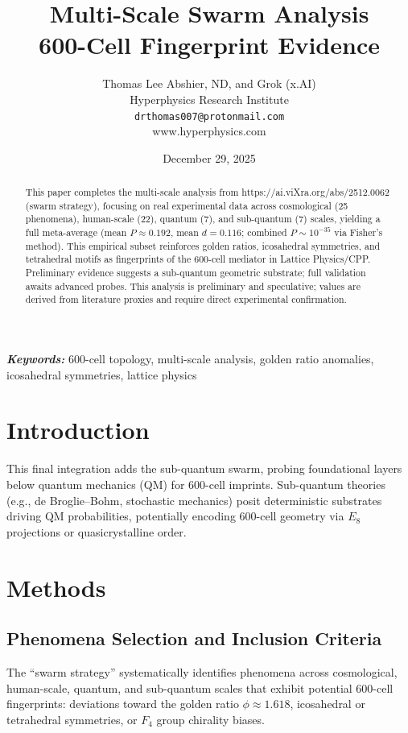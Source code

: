 \documentclass[11pt,a4paper]{article}
\title{\textbf{Multi-Scale Swarm Analysis\\
600-Cell Fingerprint Evidence}}
\author{Thomas Lee Abshier, ND, and Grok (x.AI)\\
Hyperphysics Research Institute \\
\texttt{drthomas007@protonmail.com}\\
www.hyperphysics.com}
\date{December 29, 2025}
\providecommand{\keywords}[1]
{
  \small	
  \textbf{\textit{Keywords:}} #1
}
\begin{document}
\maketitle

\begin{abstract}
This paper completes the multi-scale analysis from https://ai.viXra.org/abs/2512.0062 (swarm strategy), focusing on real experimental data across cosmological (25 phenomena), human-scale (22), quantum (7), and sub-quantum (7) scales, yielding a full meta-average (mean $P \approx 0.192$, mean $d = 0.116$; combined $P \sim 10^{-35}$ via Fisher's method). This empirical subset reinforces golden ratios, icosahedral symmetries, and tetrahedral motifs as fingerprints of the 600-cell mediator in Lattice Physics/CPP. Preliminary evidence suggests a sub-quantum geometric substrate; full validation awaits advanced probes. This analysis is preliminary and speculative; values are derived from literature proxies and require direct experimental confirmation.
\end{abstract}

\keywords{600-cell topology, multi-scale analysis, golden ratio anomalies, icosahedral symmetries, lattice physics}

\tableofcontents
\newpage

\section{Introduction}

This final integration adds the sub-quantum swarm, probing foundational layers below quantum mechanics (QM) for 600-cell imprints. Sub-quantum theories (e.g., de Broglie--Bohm, stochastic mechanics) posit deterministic substrates driving QM probabilities, potentially encoding 600-cell geometry via $E_8$ projections or quasicrystalline order.

\section{Methods}

\subsection{Phenomena Selection and Inclusion Criteria}

The ``swarm strategy'' systematically identifies phenomena across cosmological, human-scale, quantum, and sub-quantum scales that exhibit potential 600-cell fingerprints: deviations toward the golden ratio \(\phi \approx 1.618\), icosahedral or tetrahedral symmetries, or \(F_4\) group chirality biases.
\end{document}
